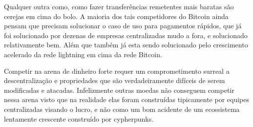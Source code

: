 Qualquer outra como, como fazer transferências remetentes mais baratas são cerejas em cima do bolo. A maioria dos tais competidores do Bitcoin ainda pensam que precisam solucionar o caso de uso para pagamentos rápidos, que já foi solucionado por dezenas de empresas centralizadas mudo a fora, e solucionado relativamente bem. Além que também já esta sendo solucionado pelo crescimento acelerado da rede lightning em cima da rede Bitcoin.

Competir na arena de dinheiro forte requer um comprometimento surreal a descentralização e propriedades que são verdadeiramente difíceis de serem modificadas e atacadas. Infelizmente outras moedas não conseguem competir nessa arena visto que na realidade elas foram construídas tipicamente por equipes centralizadas visando o lucro, e não como um bom acidente de um ecossistema lentamente crescente construído por cypherpunks.






